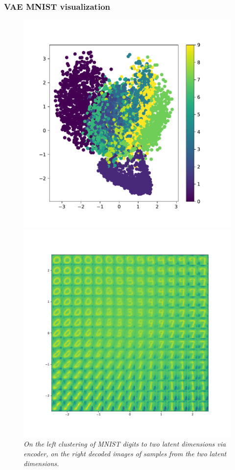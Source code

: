 \documentclass{beamer}
\begin{document}
\begin{frame}
\frametitle{VAE MNIST visualization}
\begin{figure}
	\begin{minipage}{0.45\linewidth}
	\includegraphics[scale=0.42]{vae_encoder.pdf}
\end{minipage}
	\begin{minipage}{0.45\linewidth}
		\includegraphics[scale=0.24]{vae_decoder.pdf}
	\end{minipage}
	\caption{\it On the left clustering of MNIST digits to two latent dimensions via encoder, on the right decoded images of samples from the two latent dimensions.}
\end{figure}
\end{frame}
\end{document}
